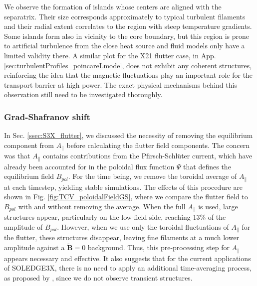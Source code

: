 We observe the formation of islands whose centers are aligned with the separatrix. Their size corresponds approximately to typical turbulent filaments and their radial extent correlates to the region with steep temperature gradients. Some islands form also in vicinity to the core boundary, but this region is prone to artificial turbulence from the close heat source and fluid models  only have a limited validity there. A similar plot for the X21 flutter case, in App. \ref{sec:turbulentProfiles_poincareLmode}, does not exhibit any coherent structures, reinforcing the idea that the magnetic fluctuations play an important role for the transport barrier at high power. The exact physical mechanisms behind this observation still need to be investigated thoroughly.


\subsubsection{Grad-Shafranov shift}

In Sec. \ref{ssec:S3X_flutter}, we discussed the necessity of removing the equilibrium component from $A_\parallel$ before calculating the flutter field components. The concern was that $A_\parallel$ contains contributions from the Pfirsch-Schlüter current, which have already been accounted for in the poloidal flux function $\Psi$ that defines the equilibrium field $B_{pol}$. For the time being, we remove the toroidal average of $A_\parallel$ at each timestep, yielding stable simulations. The effects of this procedure are shown in Fig. \ref{fig:TCV_poloidalFieldGS}, where we compare the flutter field to $B_{pol}$ with and without removing the average. When the full $A_\parallel$ is used, large structures appear, particularly on the low-field side, reaching 13\% of the amplitude of $B_{pol}$. However, when we use only the toroidal fluctuations of $A_\parallel$ for the flutter, these structures disappear, leaving fine filaments at a much lower amplitude against a $\tilde{\textbf{B}}=0$ background. Thus, this pre-processing step for $A_\parallel$ appears necessary and effective. It also suggests that for the current applications of SOLEDGE3X, there is no need to apply an additional time-averaging process, as proposed by \cite{zhang2024}, since we do not observe transient structures.

